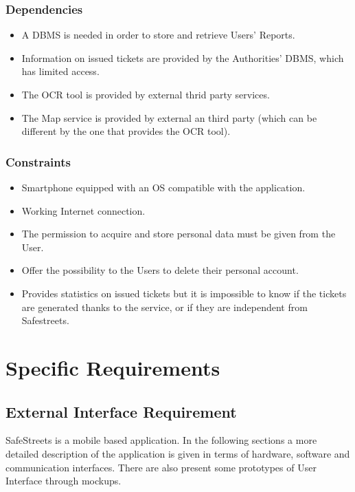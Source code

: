 \documentclass{report}
\begin{document}
\subsection{Dependencies}
\begin{itemize}
	\item A DBMS is needed in order to store and retrieve Users’ Reports.
	\item Information on issued tickets are provided by the Authorities' DBMS, which has limited access. 
	\item The OCR tool is provided by external thrid party services.
	\item The Map service is provided by external an third party (which can be different by the one that provides the OCR tool).
\end{itemize}
\subsection{Constraints} \label{constraints}
\begin{itemize}
	\item Smartphone equipped with an OS compatible with the application.
	\item Working Internet connection.
	\item The permission to acquire and store personal data must be given from the User. 
	\item Offer the possibility to the Users to delete their personal account.
	\item Provides statistics on issued tickets but it is impossible to know if the tickets are generated thanks to the service, or if they are independent from Safestreets.
	
\end{itemize}

\chapter{Specific Requirements}
\section{External Interface Requirement}
SafeStreets is a mobile based application. In the following sections a more detailed description of the application is given in terms of hardware, software and communication interfaces. There are also present some prototypes of User Interface through mockups.
\end{document}

